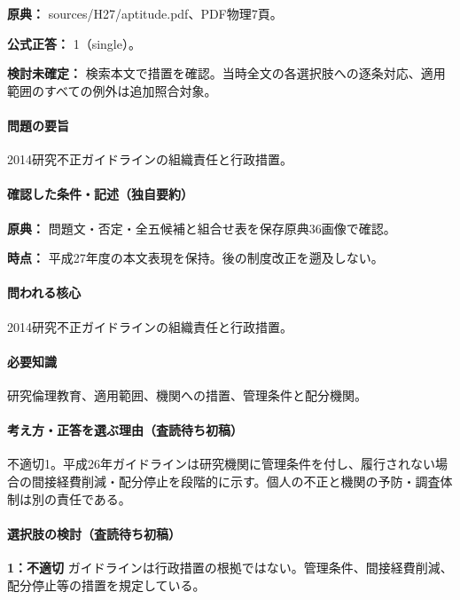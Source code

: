\noindent\textbf{原典：} sources/H27/aptitude.pdf、PDF物理7頁。

\textbf{公式正答：} 1（single）。

\par\textbf{検討未確定：} 検索本文で措置を確認。当時全文の各選択肢への逐条対応、適用範囲のすべての例外は追加照合対象。

\paragraph{問題の要旨} 2014研究不正ガイドラインの組織責任と行政措置。

\paragraph{確認した条件・記述（独自要約）}\mbox{}\par

\noindent\textbf{原典：} 問題文・否定・全五候補と組合せ表を保存原典36画像で確認。\par

\noindent\textbf{時点：} 平成27年度の本文表現を保持。後の制度改正を遡及しない。\par

\paragraph{問われる核心} 2014研究不正ガイドラインの組織責任と行政措置。

\paragraph{必要知識} 研究倫理教育、適用範囲、機関への措置、管理条件と配分機関。

\paragraph{考え方・正答を選ぶ理由（査読待ち初稿）} 不適切1。平成26年ガイドラインは研究機関に管理条件を付し、履行されない場合の間接経費削減・配分停止を段階的に示す。個人の不正と機関の予防・調査体制は別の責任である。

\paragraph{選択肢の検討（査読待ち初稿）}\mbox{}\par

\noindent\textbf{1：不適切} ガイドラインは行政措置の根拠ではない。管理条件、間接経費削減、配分停止等の措置を規定している。\par

